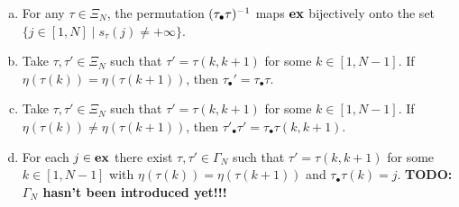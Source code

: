 \begin{lemma}\label{lem:tau_bullet}
	\leavevmode
	\begin{enumerate}[(a)]
		\item For any $\tau \in \Xi_N$, the permutation $(\tau_\bullet\tau)^{-1}$ maps $\mathbf{ex}$
		      bijectively onto the set $\{j \in [1, N] \mid s_\tau(j) \neq + \infty\}$.
		\item Take $\tau,\tau' \in \Xi_N$ such that $\tau' = \tau(k, k +1)$ for some $k \in [1,
				      N-1]$. If $\eta(\tau(k)) = \eta(\tau(k+1))$, then $\tau_\bullet' = \tau_\bullet\tau$.
		\item Take $\tau,\tau' \in \Xi_N$ such that $\tau' = \tau(k, k +1)$ for some $k \in [1,
				      N-1]$. If $\eta(\tau(k)) \neq \eta(\tau(k+1))$, then $\tau'_\bullet\tau' =
			      \tau_\bullet\tau (k, k +1)$.
		\item For each $j \in \mathbf{ex}$ there exist $\tau, \tau'\in \Gamma_N$ such that $\tau' = \tau(k,
			      k+1)$ for some $k \in [1, N-1]$ with $\eta(\tau(k)) = \eta(\tau(k+1))$ and
		      $\tau_\bullet\tau(k) = j$. \textbf{TODO: $\Gamma_N$ hasn't been introduced yet!!!}
	\end{enumerate}
\end{lemma}

